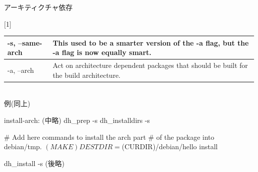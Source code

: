 \documentclass[mingoth,a4paper]{jsarticle}
\begin{document}
アーキティクチャ依存
\begin{table}[htb]
\scalebox{1}[1]{
\begin{tabular}{|l|p{30em}|} \hline
-s, --same-arch & This used to be a smarter version of the -a flag, but the -a flag is now equally smart. \\ \hline
-a, --arch & Act on architecture dependent packages that should be built for the build architecture. \\ \hline
\end{tabular}
}
\end{table}
\\
\clearpage
例(同上)
\begin{commandline}
install-arch:
	(中略)
        dh_prep -s 
        dh_installdirs -s

        # Add here commands to install the arch part 
        # of the package into debian/tmp.
        $(MAKE) DESTDIR=$(CURDIR)/debian/hello install

        dh_install -s
	(後略)
\end{commandline}
\end{document}
